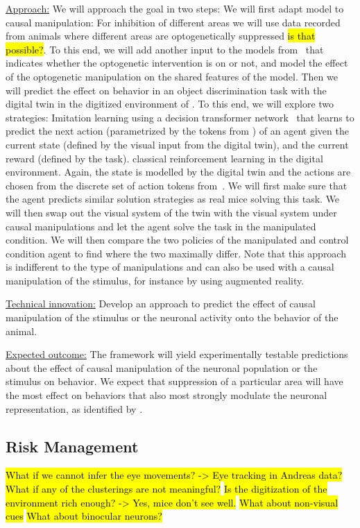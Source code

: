 \documentclass[COG,11pt]{ercgrant}
\begin{document}
\underline{Approach:} 
We will approach the goal in two steps:  We will first adapt model to causal manipulation: For inhibition of different areas we will use data recorded from animals where different areas are optogenetically suppressed \hl{is that possible?}. 
To this end, we will add another input to the models from \obji~that indicates whether the optogenetic intervention is on or not, and model the effect of the optogenetic manipulation on the shared features of the model. 
Then we will predict the effect on behavior in an object discrimination task with the digital twin in the digitized environment of \obji. 
To this end, we will explore two strategies:  Imitation learning using a decision transformer network~\parencite{Chen2021-ap} that learns to predict the next action (parametrized by the tokens from \objii) of an agent given the current state (defined by the visual input from the digital twin), and the current reward (defined by the task).  classical reinforcement learning in the digital environment. Again, the state is modelled by the digital twin and the actions are chosen from the discrete set of action tokens from~\objii. 
We will first make sure that the agent predicts similar solution strategies as real mice solving this task.
We will then swap out the visual system of the twin with the visual system under causal manipulations and let the agent solve the task in the manipulated condition. 
We will then compare the two policies of the manipulated and control condition agent to find where the two maximally differ. 
Note that this approach is indifferent to the type of manipulations and can also be used with a causal manipulation of the stimulus, for instance by using augmented reality. 

\underline{Technical innovation:} Develop an approach to predict the effect of causal manipulation of the stimulus or the neuronal activity onto the behavior of the animal. 

\underline{Expected outcome:} 
The framework will yield experimentally testable predictions about the effect of causal manipulation of the neuronal population or the stimulus on behavior. 
We expect that suppression of a particular area will have the most effect on behaviors that also most strongly modulate the neuronal representation, as identified by \objii. 

\subsection{Risk Management}
\hl{What if we cannot infer the eye movements? -> Eye tracking in Andreas data?}
\hl{What if any of the clusterings are not meaningful?}
\hl{Is the digitization of the environment rich enough? -> Yes, mice don't see well. }
\hl{What about non-visual cues}
\hl{What about binocular neurons?}
\begin{small}
\printbibliography
\end{small}
\end{document}

